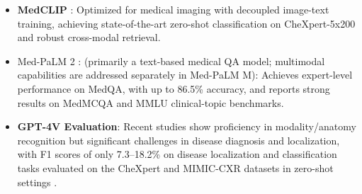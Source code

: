 \documentclass[pdflatex,sn-mathphys-num]{sn-jnl}%
\theoremstyle{thmstyleone}%
\theoremstyle{thmstyletwo}%
\theoremstyle{thmstylethree}%
\begin{document}
\begin{itemize}
    \item \textbf{MedCLIP} \cite{wang2022medclipcontrastivelearningunpaired}: Optimized for medical imaging with decoupled image-text training, achieving state-of-the-art zero-shot classification on CheXpert-5x200 and robust cross-modal retrieval.
    
    \item 
    Med-PaLM 2 \cite{singhal2023expertlevelmedicalquestionanswering}:  (primarily a text-based medical QA model; multimodal capabilities are addressed separately in Med-PaLM M): Achieves expert-level performance on MedQA, with up to 86.5\% accuracy, and reports strong results on MedMCQA and MMLU clinical-topic benchmarks. 
    \item \textbf{GPT-4V Evaluation}: Recent studies show proficiency in modality/anatomy recognition but significant challenges in disease diagnosis and localization, with F1 scores of only 7.3–18.2\% on disease localization and classification tasks evaluated on the CheXpert and MIMIC-CXR datasets in zero-shot settings \cite{liu2023holisticevaluationgpt4vbiomedical, chu2025reducinghallucinationsmedicalmultimodal}.
\end{itemize}
\end{document}
